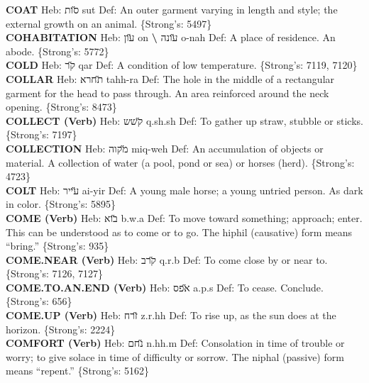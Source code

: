 {\textbf{COAT} Heb: {\large\H סות} sut Def: An outer garment varying in length and style; the external growth on an animal. \{Strong's: 5497\}\hfill{}\\

\textbf{COHABITATION} Heb: {\large\H עון} on \textbf{\textbackslash{}} {\large\H עונה} o-nah Def: A place of residence. An abode. \{Strong's: 5772\}\hfill{}\\

\textbf{COLD} Heb: {\large\H קר} qar Def: A condition of low temperature. \{Strong's: 7119, 7120\}\hfill{}\\

\textbf{COLLAR} Heb: {\large\H תחרא} tahh-ra Def: The hole in the middle of a rectangular garment for the head to pass through. An area reinforced around the neck opening. \{Strong's: 8473\}\hfill{}\\

\textbf{COLLECT (Verb)} Heb: {\large\H קשש} q.sh.sh Def: To gather up straw, stubble or sticks. \{Strong's: 7197\}\hfill{}\\

\textbf{COLLECTION} Heb: {\large\H מקוה} miq-weh Def: An accumulation of objects or material. A collection of water (a pool, pond or sea) or horses (herd). \{Strong's: 4723\}\hfill{}\\

\textbf{COLT} Heb: {\large\H עייר} ai-yir Def: A young male horse; a young untried person. As dark in color. \{Strong's: 5895\}\hfill{}\\

\textbf{COME (Verb)} Heb: {\large\H בוא} b.w.a Def: To move toward something; approach; enter. This can be understood as to come or to go. The hiphil (causative) form means ``bring.'' \{Strong's: 935\}\hfill{}\\

\textbf{COME.NEAR (Verb)} Heb: {\large\H קרב} q.r.b Def: To come close by or near to. \{Strong's: 7126, 7127\}\hfill{}\\

\textbf{COME.TO.AN.END (Verb)} Heb: {\large\H אפס} a.p.s Def: To cease. Conclude. \{Strong's: 656\}\hfill{}\\

\textbf{COME.UP (Verb)} Heb: {\large\H זרח} z.r.hh Def: To rise up, as the sun does at the horizon. \{Strong's: 2224\}\hfill{}\\

\textbf{COMFORT (Verb)} Heb: {\large\H נחם} n.hh.m Def: Consolation in time of trouble or worry; to give solace in time of difficulty or sorrow. The niphal (passive) form means ``repent.'' \{Strong's: 5162\}\hfill{}\\

}
